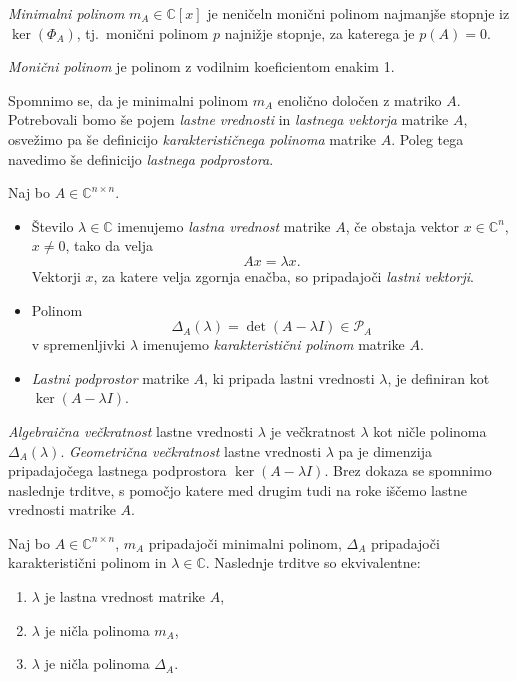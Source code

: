 \documentclass[mat1]{fmfdelo}
\newcommand{\C}{\mathbb C}
\begin{document}
\begin{definicija}
    \emph{Minimalni polinom} $m_A \in \C[x]$ je neničeln monični polinom najmanjše stopnje iz $\ker(\Phi_A)$, tj.\ monični polinom $p$ najnižje stopnje, za katerega je $p(A) = 0$.
\end{definicija}
\begin{opomba}
    \emph{Monični polinom} je polinom z vodilnim koeficientom enakim 1.
\end{opomba}
Spomnimo se, da je minimalni polinom $m_A$ enolično določen z matriko $A$. Potrebovali bomo še pojem \emph{lastne vrednosti} in \emph{lastnega vektorja} matrike $A$, osvežimo pa še definicijo \emph{karakterističnega polinoma} matrike $A$. Poleg tega navedimo še definicijo \emph{lastnega podprostora}.
\begin{definicija}
    Naj bo $A \in \C^{n \times n}$.
    \begin{itemize}
        \item Število $\lambda \in \C$ imenujemo \emph{lastna vrednost} matrike $A$, če obstaja vektor $x \in \C^n$, $x \neq 0$, tako da velja
        \begin{equation}
            Ax = \lambda x.
        \end{equation}
        Vektorji $x$, za katere velja zgornja enačba, so pripadajoči \emph{lastni vektorji}.
        \item Polinom
        \begin{equation}
            \Delta_A(\lambda) = \det (A - \lambda I) \in \mathcal{P}_A
        \end{equation}
        v spremenljivki $\lambda$ imenujemo \emph{karakteristični polinom} matrike $A$.
        \item \emph{Lastni podprostor} matrike $A$, ki pripada lastni vrednosti $\lambda$, je definiran kot $\ker (A - \lambda I)$.
    \end{itemize}
\end{definicija}
\emph{Algebraična večkratnost} lastne vrednosti $\lambda$ je večkratnost $\lambda$ kot ničle polinoma $\Delta_A(\lambda)$. \emph{Geometrična večkratnost} lastne vrednosti $\lambda$ pa je dimenzija pripadajočega lastnega podprostora $\ker (A - \lambda I)$.
Brez dokaza se spomnimo naslednje trditve, s pomočjo katere med drugim tudi na roke iščemo lastne vrednosti matrike $A$.
\begin{trditev}
    Naj bo $A \in \C^{n \times n}$, $m_A$ pripadajoči minimalni polinom, $\Delta_A$ pripadajoči karakteristični polinom in $\lambda \in \C$. Naslednje trditve so ekvivalentne:
    \begin{enumerate}
        \item $\lambda$ je lastna vrednost matrike $A$,
        \item $\lambda$ je ničla polinoma $m_A$,
        \item $\lambda$ je ničla polinoma $\Delta_A$.
    \end{enumerate}
\end{trditev}
\end{document}
